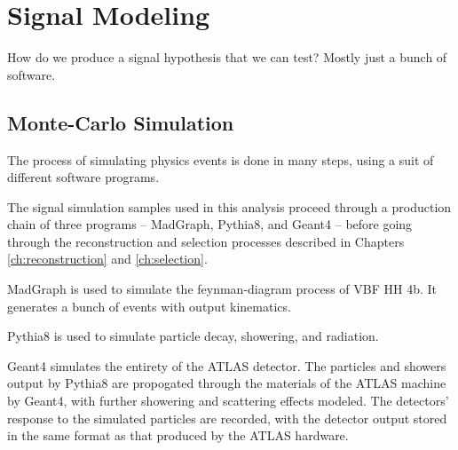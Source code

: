 \chapter{Signal Modeling}

How do we produce a signal hypothesis that we can test?
Mostly just a bunch of software.

\section{Monte-Carlo Simulation} \label{sec:mcsim}

    The process of simulating physics events is done in many steps, using a suit of different software programs.

    The signal simulation samples used in this analysis proceed through a production chain of three programs
        -- MadGraph, Pythia8, and Geant4 -- before going through the reconstruction and selection processes described in Chapters \ref{ch:reconstruction} and \ref{ch:selection}.

    MadGraph is used to simulate the feynman-diagram process of VBF \to HH \to 4b.
    It generates a bunch of events with output kinematics.

    Pythia8 is used to simulate particle decay, showering, and radiation.

    Geant4 simulates the entirety of the ATLAS detector.
    The particles and showers output by Pythia8 are propogated through the materials of the ATLAS machine by Geant4,
        with further showering and scattering effects modeled.
    The detectors' response to the simulated particles are recorded, with the detector output stored in the same format as that produced by the ATLAS hardware.

